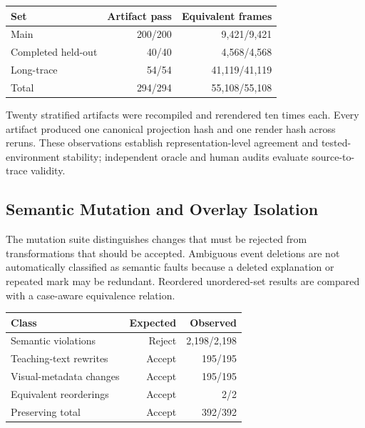 \documentclass[letterpaper]{article}
\newenvironment{coltable}
  {\begin{center}\begin{minipage}{\columnwidth}\centering}
  {\end{minipage}\end{center}}
\begin{document}
\begin{coltable}
\small
\begin{tabular}{@{}lrr@{}}
\toprule
Set & Artifact pass & Equivalent frames \\
\midrule
Main & 200/200 & 9,421/9,421 \\
Completed held-out & 40/40 & 4,568/4,568 \\
Long-trace & 54/54 & 41,119/41,119 \\
\midrule
Total & 294/294 & 55,108/55,108 \\
\bottomrule
\end{tabular}
\label{tab:projection-audit}
\end{coltable}

Twenty stratified artifacts were recompiled and rerendered ten times each. Every artifact produced one canonical projection hash and one render hash across reruns. These observations establish representation-level agreement and tested-environment stability; independent oracle and human audits evaluate source-to-trace validity.

\subsection{Semantic Mutation and Overlay Isolation}

The mutation suite distinguishes changes that must be rejected from transformations that should be accepted. Ambiguous event deletions are not automatically classified as semantic faults because a deleted explanation or repeated mark may be redundant. Reordered unordered-set results are compared with a case-aware equivalence relation.

\begin{coltable}
\small
\begin{tabular}{@{}lrr@{}}
\toprule
Class & Expected & Observed \\
\midrule
Semantic violations & Reject & 2,198/2,198 \\
Teaching-text rewrites & Accept & 195/195 \\
Visual-metadata changes & Accept & 195/195 \\
Equivalent reorderings & Accept & 2/2 \\
\midrule
Preserving total & Accept & 392/392 \\
\bottomrule
\end{tabular}
\label{tab:mutation-audit}
\end{coltable}
\end{document}
